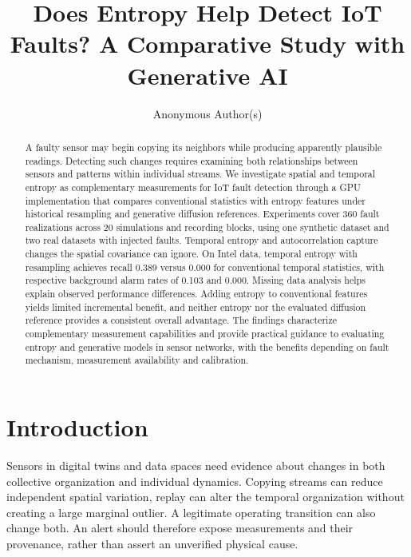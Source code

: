 \documentclass{llncs}
\title{Does Entropy Help Detect IoT Faults? A Comparative Study with Generative AI}
\author{Anonymous Author(s)}
\institute{}
\begin{document}
\maketitle
\begin{abstract}
A faulty sensor may begin copying its neighbors while producing apparently plausible readings. Detecting such changes requires examining both relationships between sensors and patterns within individual streams. We investigate spatial and temporal entropy as complementary measurements for IoT fault detection through a GPU implementation that compares conventional statistics with entropy features under historical resampling and generative diffusion references. Experiments cover 360 fault realizations across 20 simulations and recording blocks, using one synthetic dataset and two real datasets with injected faults. Temporal entropy and autocorrelation capture changes the spatial covariance can ignore. On Intel data, temporal entropy with resampling achieves recall 0.389 versus 0.000 for conventional temporal statistics, with respective background alarm rates of 0.103 and 0.000. Missing data analysis helps explain observed performance differences. Adding entropy to conventional features yields limited incremental benefit, and neither entropy nor the evaluated diffusion reference provides a consistent overall advantage. The findings characterize complementary measurement capabilities and provide practical guidance to evaluating entropy and generative models in sensor networks, with the benefits depending on fault mechanism, measurement availability and calibration.
\end{abstract}

\section{Introduction}
Sensors in digital twins and data spaces need evidence about changes in both
collective organization and individual dynamics. Copying streams can reduce
independent spatial variation, replay can alter the temporal organization without
creating a large marginal outlier. A legitimate operating transition can also
change both. An alert should therefore expose measurements and their provenance,
rather than assert an unverified physical cause.
\end{document}
